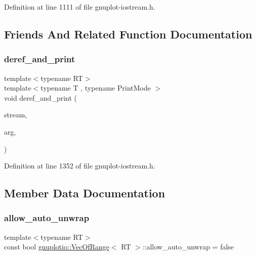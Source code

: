 Definition at line 1111 of file gnuplot-\/iostream.\+h.



\subsection{Friends And Related Function Documentation}
\mbox{\label{classgnuplotio_1_1_vec_of_range_adafbfb0122b8e499d1af9c246f4ac288}} 
\subsubsection{\texorpdfstring{deref\+\_\+and\+\_\+print}{deref\_and\_print}}
{\footnotesize\ttfamily template$<$typename RT$>$ \\
template$<$typename T , typename Print\+Mode $>$ \\
void deref\+\_\+and\+\_\+print (\begin{DoxyParamCaption}\item[{std\+::ostream \&}]{stream,  }\item[{const \hyperlink{classgnuplotio_1_1_vec_of_range}{Vec\+Of\+Range}$<$ T $>$ \&}]{arg,  }\item[{Print\+Mode}]{ }\end{DoxyParamCaption})\hspace{0.3cm}{\ttfamily [friend]}}



Definition at line 1352 of file gnuplot-\/iostream.\+h.



\subsection{Member Data Documentation}
\mbox{\label{classgnuplotio_1_1_vec_of_range_a19d87e61a7854f9e22d3dd8a94f79500}} 
\subsubsection{\texorpdfstring{allow\+\_\+auto\+\_\+unwrap}{allow\_auto\_unwrap}}
{\footnotesize\ttfamily template$<$typename RT$>$ \\
const bool \hyperlink{classgnuplotio_1_1_vec_of_range}{gnuplotio\+::\+Vec\+Of\+Range}$<$ RT $>$\+::allow\+\_\+auto\+\_\+unwrap = false\hspace{0.3cm}{\ttfamily [static]}}




